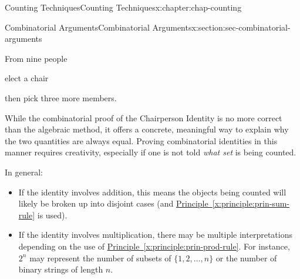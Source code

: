 \documentclass[oneside,10pt,]{book}
\newcommand{\xreffont}{\relax}
\numberwithin{equation}{section}
\begin{document}
\begin{chapterptx}{Counting Techniques}{}{Counting Techniques}{}{}{x:chapter:chap-counting}
\begin{sectionptx}{Combinatorial Arguments}{}{Combinatorial Arguments}{}{}{x:section:sec-combinatorial-arguments}
\begin{sidebyside}{3}{0.085}{0.085}{0.17}
\begin{sbspanel}{0.17}
{
}%
\end{sbspanel}%
\begin{sbspanel}{0.17}%
%
\end{sbspanel}%
\end{sidebyside}%
\begin{sidebyside}{3}{0.085}{0.085}{0.17}%
\begin{sbspanel}{0.15}%
From nine people%
\end{sbspanel}%
\begin{sbspanel}{0.17}%
\par
elect a chair%
\end{sbspanel}%
\begin{sbspanel}{0.17}%
\par
then pick three more members.%
\end{sbspanel}%
\end{sidebyside}%
\par
While the combinatorial proof of the Chairperson Identity is no more correct than the algebraic method, it offers a concrete, meaningful way to explain why the two quantities are always equal. Proving combinatorial identities in this manner requires creativity, especially if one is not told \emph{what set} is being counted.%
\par
In general:%
\begin{itemize}[label=\textbullet]
\item{}If the identity involves addition, this means the objects being counted will likely be broken up into disjoint cases (and \hyperref[x:principle:prin-sum-rule]{Principle~{\xreffont\ref{x:principle:prin-sum-rule}}} is used).%
\item{}If the identity involves multiplication, there may be multiple interpretations depending on the use of \hyperref[x:principle:prin-prod-rule]{Principle~{\xreffont\ref{x:principle:prin-prod-rule}}}. For instance, \(2^n\) may represent the number of subsets of \(\{1,2,\ldots,n\}\) or the number of binary strings of length \(n\).%

\end{itemize}
\end{sectionptx}
\end{chapterptx}
\end{document}
